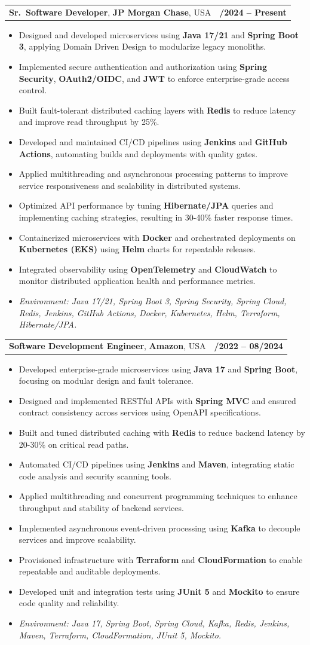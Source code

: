 \documentclass[letterpaper,11pt]{article}
\makeatletter
\newcommand{\resumeItem}[1]{
  \item\footnotesize{
    {#1 \vspace{-2pt}}
  }
}
\newcommand{\resumeSubheading}[4]{
  \vspace{-2pt}\item
    \begin{tabular*}{1.0\textwidth}[t]{l@{\extracolsep{\fill}}r}
      \textbf{\fontsize{10pt}{14pt}\selectfont #3}, \textbf{\fontsize{10pt}{14pt}\selectfont #1}, \fontsize{10pt}{14pt}\selectfont #4 & \textbf{\fontsize{10pt}{14pt}\selectfont #2} \\
    \end{tabular*}\vspace{-7pt}
}
\newcommand{\resumeItemListStart}{\begin{itemize}[leftmargin=*]}
\newcommand{\resumeItemListEnd}{\end{itemize}\vspace{-5pt}}
\makeatother
\begin{document}
\resumeSubheading
{JP Morgan Chase}{09/2024 -- Present}
{Sr.\ Software Developer}{USA}
\resumeItemListStart
  \resumeItem{Designed and developed microservices using \textbf{Java 17/21} and \textbf{Spring Boot 3}, applying Domain Driven Design to modularize legacy monoliths.}
  \resumeItem{Implemented secure authentication and authorization using \textbf{Spring Security}, \textbf{OAuth2/OIDC}, and \textbf{JWT} to enforce enterprise-grade access control.}
  \resumeItem{Built fault-tolerant distributed caching layers with \textbf{Redis} to reduce latency and improve read throughput by 25\%.}
  \resumeItem{Developed and maintained CI/CD pipelines using \textbf{Jenkins} and \textbf{GitHub Actions}, automating builds and deployments with quality gates.}
  \resumeItem{Applied multithreading and asynchronous processing patterns to improve service responsiveness and scalability in distributed systems.}
  \resumeItem{Optimized API performance by tuning \textbf{Hibernate/JPA} queries and implementing caching strategies, resulting in 30-40\% faster response times.}
  \resumeItem{Containerized microservices with \textbf{Docker} and orchestrated deployments on \textbf{Kubernetes (EKS)} using \textbf{Helm} charts for repeatable releases.}
  \resumeItem{Integrated observability using \textbf{OpenTelemetry} and \textbf{CloudWatch} to monitor distributed application health and performance metrics.}
  \resumeItem{\textit{Environment: Java 17/21, Spring Boot 3, Spring Security, Spring Cloud, Redis, Jenkins, GitHub Actions, Docker, Kubernetes, Helm, Terraform, Hibernate/JPA.}}
\resumeItemListEnd

\resumeSubheading
{Amazon}{10/2022 -- 08/2024}
{Software Development Engineer}{USA}
\resumeItemListStart
  \resumeItem{Developed enterprise-grade microservices using \textbf{Java 17} and \textbf{Spring Boot}, focusing on modular design and fault tolerance.}
  \resumeItem{Designed and implemented RESTful APIs with \textbf{Spring MVC} and ensured contract consistency across services using OpenAPI specifications.}
  \resumeItem{Built and tuned distributed caching with \textbf{Redis} to reduce backend latency by 20-30\% on critical read paths.}
  \resumeItem{Automated CI/CD pipelines using \textbf{Jenkins} and \textbf{Maven}, integrating static code analysis and security scanning tools.}
  \resumeItem{Applied multithreading and concurrent programming techniques to enhance throughput and stability of backend services.}
  \resumeItem{Implemented asynchronous event-driven processing using \textbf{Kafka} to decouple services and improve scalability.}
  \resumeItem{Provisioned infrastructure with \textbf{Terraform} and \textbf{CloudFormation} to enable repeatable and auditable deployments.}
  \resumeItem{Developed unit and integration tests using \textbf{JUnit 5} and \textbf{Mockito} to ensure code quality and reliability.}
  \resumeItem{\textit{Environment: Java 17, Spring Boot, Spring Cloud, Kafka, Redis, Jenkins, Maven, Terraform, CloudFormation, JUnit 5, Mockito.}}
\resumeItemListEnd
\end{document}

